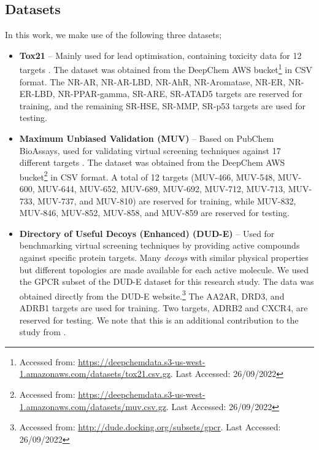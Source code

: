 \documentclass[journal=jcisd8,manuscript=article]{achemso} %
\begin{document}
\subsection{Datasets}

In this work, we make use of the following three datasets;

\begin{itemize}

    \item \textbf{Tox21} \citep{huang2016tox21challenge} -- Mainly used for lead optimisation, containing toxicity data for 12 targets \citep{tox21}. The dataset was obtained from the DeepChem AWS bucket\footnote{Accessed from: \url{https://deepchemdata.s3-us-west-1.amazonaws.com/datasets/tox21.csv.gz}. Last Accessed: 26/09/2022} in CSV format. The NR-AR, NR-AR-LBD, NR-AhR, NR-Aromatase, NR-ER, NR-ER-LBD, NR-PPAR-gamma, SR-ARE, SR-ATAD5 targets are reserved for training, and the remaining SR-HSE, SR-MMP, SR-p53 targets are used for testing.

    \item \textbf{Maximum Unbiased Validation (MUV)} \citep{rohrer2009maximum} -- Based on PubChem BioAssays, used for validating virtual screening techniques against 17 different targets \citep{rohrer2009maximum}. The dataset was obtained from the DeepChem AWS bucket\footnote{Accessed from: \url{https://deepchemdata.s3-us-west-1.amazonaws.com/datasets/muv.csv.gz}. Last Accessed: 26/09/2022} in CSV format. A total of 12 targets (MUV-466, MUV-548, MUV-600, MUV-644, MUV-652, MUV-689, MUV-692, MUV-712, MUV-713, MUV-733, MUV-737, and MUV-810) are reserved for training, while MUV-832, MUV-846, MUV-852, MUV-858, and MUV-859 are reserved for testing.

    \item \textbf{Directory of Useful Decoys (Enhanced) (DUD-E)} \cite{mysinger2012directory} -- Used for benchmarking virtual screening techniques by providing active compounds against specific protein targets. Many \textit{decoys} with similar physical properties but different topologies are made available for each active molecule. We used the GPCR subset of the DUD-E dataset \citep{mysinger2012directory} for this research study. The data was obtained directly from the DUD-E website.\footnote{Accessed from: \url{http://dude.docking.org/subsets/gpcr}. Last Accessed: 26/09/2022} The AA2AR, DRD3, and ADRB1 targets are used for training. Two targets, ADRB2 and CXCR4, are reserved for testing. We note that this is an additional contribution to the study from \citet{altae2017low}.
\end{itemize}
\end{document}
